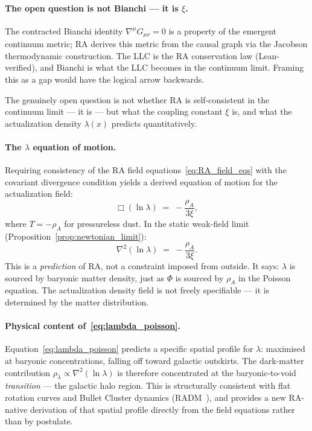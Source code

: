 \documentclass[11pt,a4paper]{article}
\theoremstyle{plain}
\theoremstyle{definition}
\theoremstyle{remark}
\begin{document}
\begin{description}
\paragraph{The open question is not Bianchi — it is $\xi$.}
The contracted Bianchi identity $\nabla^\mu G_{\mu\nu} = 0$ is a property of
the emergent continuum metric; RA derives this metric from the causal graph via
the Jacobson thermodynamic construction. The LLC is the RA conservation law
(Lean-verified), and Bianchi is what the LLC becomes in the continuum limit.
Framing this as a gap would have the logical arrow backwards.

The genuinely open question is not whether RA is self-consistent in the continuum
limit --- it is --- but what the coupling constant $\xi$ is, and what the
actualization density $\lambda(x)$ predicts quantitatively.

\paragraph{The $\lambda$ equation of motion.}
Requiring consistency of the RA field equations~\eqref{eq:RA_field_eqs} with
the covariant divergence condition yields a derived equation of motion for the
actualization field:
\begin{equation}
  \Box(\ln\lambda) \;=\; -\frac{\rho_A}{3\xi},
  \label{eq:lambda_eom}
\end{equation}
where $T = -\rho_A$ for pressureless dust. In the static weak-field limit
(Proposition~\ref{prop:newtonian_limit}):
\begin{equation}
  \nabla^2(\ln\lambda) \;=\; -\frac{\rho_A}{3\xi}.
  \label{eq:lambda_poisson}
\end{equation}
This is a \emph{prediction} of RA, not a constraint imposed from outside.
It says: $\lambda$ is sourced by baryonic matter density, just as $\Phi$
is sourced by $\rho_A$ in the Poisson equation. The actualization density
field is not freely specifiable --- it is determined by the matter distribution.

\paragraph{Physical content of~\eqref{eq:lambda_poisson}.}
Equation~\eqref{eq:lambda_poisson} predicts a specific spatial profile for $\lambda$:
maximised at baryonic concentrations, falling off toward galactic outskirts.
The dark-matter contribution $\rho_\lambda \propto \nabla^2(\ln\lambda)$ is therefore
concentrated at the baryonic-to-void \emph{transition} --- the galactic halo region.
This is structurally consistent with flat rotation curves and Bullet Cluster dynamics
(RADM~\citep{Sandeman2026RADM}), and provides a new RA-native derivation of
that spatial profile directly from the field equations rather than by postulate.


\end{description}
\end{document}
